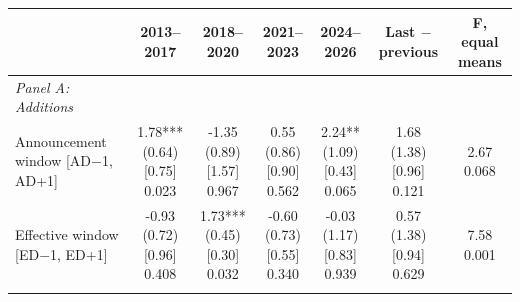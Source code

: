 \begin{threeparttable}
\begingroup
\renewcommand\cellalign{t}
\renewcommand\arraystretch{1}
\setlength{\tabcolsep}{5pt}
\begin{tabular}{@{}lcccccc}
\toprule
 & 2013–2017 & 2018–2020 & 2021–2023 & 2024–2026 & Last $-$ previous & F, equal means \\
\midrule
\emph{Panel A: Additions} \\
\addlinespace[0.25ex]
\addlinespace[1ex]
Announcement window [AD$-$1, AD+1] & \makecell{1.78***\\(0.64)\\{}[0.75]\\{0.023}} & \makecell{-1.35\\(0.89)\\{}[1.57]\\{0.967}} & \makecell{0.55\\(0.86)\\{}[0.90]\\{0.562}} & \makecell{2.24**\\(1.09)\\{}[0.43]\\{0.065}} & \makecell{1.68\\(1.38)\\{}[0.96]\\{0.121}} & \makecell{2.67\\{0.068}} \\
\addlinespace[0.25ex]
\addlinespace[0.25ex]
Effective window [ED$-$1, ED+1] & \makecell{-0.93\\(0.72)\\{}[0.96]\\{0.408}} & \makecell{1.73***\\(0.45)\\{}[0.30]\\{0.032}} & \makecell{-0.60\\(0.73)\\{}[0.55]\\{0.340}} & \makecell{-0.03\\(1.17)\\{}[0.83]\\{0.939}} & \makecell{0.57\\(1.38)\\{}[0.94]\\{0.629}} & \makecell{7.58\\{0.001}} \\
\addlinespace[0.25ex]
\addlinespace[0.25ex]

\end{tabular}
\end{threeparttable}
